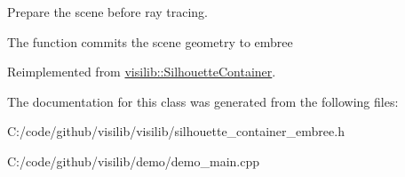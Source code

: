 Prepare the scene before ray tracing. 

The function commits the scene geometry to embree 

Reimplemented from \mbox{\hyperlink{classvisilib_1_1_silhouette_container}{visilib\+::\+Silhouette\+Container}}.



The documentation for this class was generated from the following files\+:\begin{DoxyCompactItemize}
\item 
C\+:/code/github/visilib/visilib/silhouette\+\_\+container\+\_\+embree.\+h\item 
C\+:/code/github/visilib/demo/demo\+\_\+main.\+cpp\end{DoxyCompactItemize}
